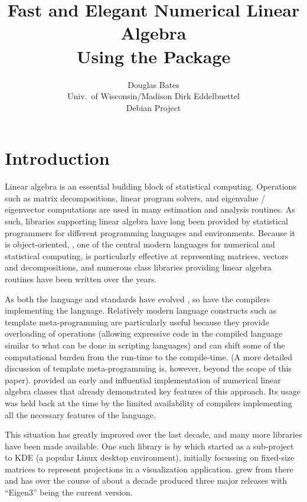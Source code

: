 \documentclass[shortnames,article]{jss}
\author{Douglas Bates\\Univ.~of Wisconsin/Madison \And Dirk Eddelbuettel\\Debian Project} %
\title{Fast and Elegant Numerical Linear Algebra\\ Using the \pkg{RcppEigen} Package}
\begin{document}

\section{Introduction}
\label{sec:intro}

Linear algebra is an essential building block of statistical
computing.  Operations such as matrix decompositions, linear program
solvers, and eigenvalue / eigenvector computations are used in many
estimation and analysis routines. As such, libraries supporting linear
algebra have long been provided by statistical programmers for
different programming languages and environments.  Because it is
object-oriented, , one of the central modern languages
for numerical and statistical computing, is particularly effective at
representing matrices, vectors and decompositions, and numerous class
libraries providing linear algebra routines have been written over the
years.

As both the  language and standards have evolved
\citep{Meyers:2005:EffectiveC++,Meyers:1995:MoreEffectiveC++,cpp11},
so have the compilers implementing the language.  Relatively modern
language constructs such as template meta-programming are particularly
useful because they provide overloading of operations (allowing
expressive code in the compiled language similar to what can be done
in scripting languages) and can shift some of the computational burden
from the run-time to the compile-time. (A more detailed discussion of
template meta-programming is, however, beyond the scope of this
paper). \cite{Veldhuizen:1998:Blitz} provided an early and influential
implementation of numerical linear algebra classes that already
demonstrated key features of this approach.  Its usage was held back
at the time by the limited availability of compilers implementing all the
necessary features of the  language.

This situation has greatly improved over the last decade, and many more
libraries have been made available. One such  library is
 by \citet*{Eigen:Web} which started as a sub-project to
KDE (a popular Linux desktop environment), initially focussing on fixed-size
matrices to represent projections in a visualization application. 
grew from there and has over the course of about a decade produced three
major releases with ``Eigen3'' being the current version.
\end{document}
